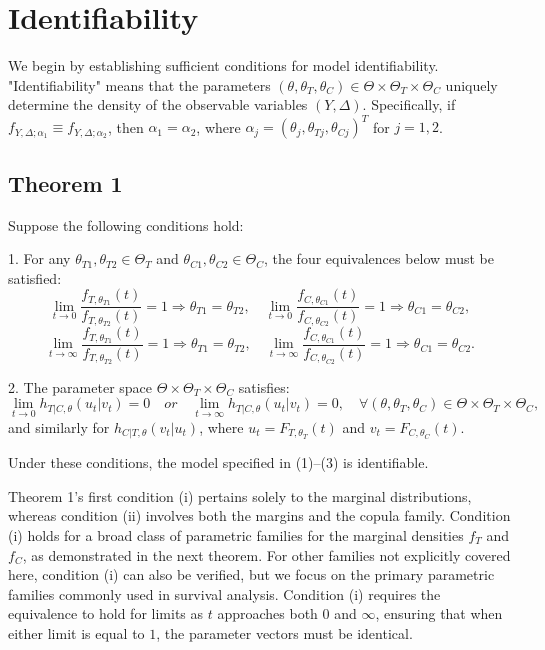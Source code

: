 \section{Identifiability}

We begin by establishing sufficient conditions for model identifiability. "Identifiability" means that the parameters \((\theta, \theta_T, \theta_C) \in \Theta \times \Theta_T \times \Theta_C\) uniquely determine the density of the observable variables \((Y, \Delta)\). Specifically, if \(f_{Y, \Delta; \alpha_1} \equiv f_{Y, \Delta; \alpha_2}\), then \(\alpha_1 = \alpha_2\), where \(\alpha_j = (\theta_j, \theta_{Tj}, \theta_{Cj})^T\) for \(j = 1, 2\).

\subsection*{Theorem 1}
 Suppose the following conditions hold:

1. For any \(\theta_{T1}, \theta_{T2} \in \Theta_T\) and \(\theta_{C1}, \theta_{C2} \in \Theta_C\), the four equivalences below must be satisfied:
   \[
   \lim_{t \to 0} \frac{f_{T, \theta_{T1}}(t)}{f_{T, \theta_{T2}}(t)} = 1 \Rightarrow \theta_{T1} = \theta_{T2}, \quad
   \lim_{t \to 0} \frac{f_{C, \theta_{C1}}(t)}{f_{C, \theta_{C2}}(t)} = 1 \Rightarrow \theta_{C1} = \theta_{C2},
   \]
   \[
   \lim_{t \to \infty} \frac{f_{T, \theta_{T1}}(t)}{f_{T, \theta_{T2}}(t)} = 1 \Rightarrow \theta_{T1} = \theta_{T2}, \quad
   \lim_{t \to \infty} \frac{f_{C, \theta_{C1}}(t)}{f_{C, \theta_{C2}}(t)} = 1 \Rightarrow \theta_{C1} = \theta_{C2}.
   \]

2. The parameter space \(\Theta \times \Theta_T \times \Theta_C\) satisfies:
   \[
    \lim_{t \to 0} h_{T|C, \theta}(u_t | v_t) = 0 \quad {or} \quad \lim_{t \to \infty} h_{T|C, \theta}(u_t | v_t) = 0, \quad \forall (\theta, \theta_T, \theta_C) \in \Theta \times \Theta_T \times \Theta_C,
   \]
   and similarly for \(h_{C|T, \theta}(v_t | u_t)\), where \(u_t = F_{T, \theta_T}(t)\) and \(v_t = F_{C, \theta_C}(t)\).

Under these conditions, the model specified in (1)–(3) is identifiable.

Theorem 1's first condition (i) pertains solely to the marginal distributions, whereas condition (ii) involves both the margins and the copula family. Condition (i) holds for a broad class of parametric families for the marginal densities \(f_T\) and \(f_C\), as demonstrated in the next theorem. For other families not explicitly covered here, condition (i) can also be verified, but we focus on the primary parametric families commonly used in survival analysis. Condition (i) requires the equivalence to hold for limits as \(t\) approaches both \(0\) and \(\infty\), ensuring that when either limit is equal to \(1\), the parameter vectors must be identical.

